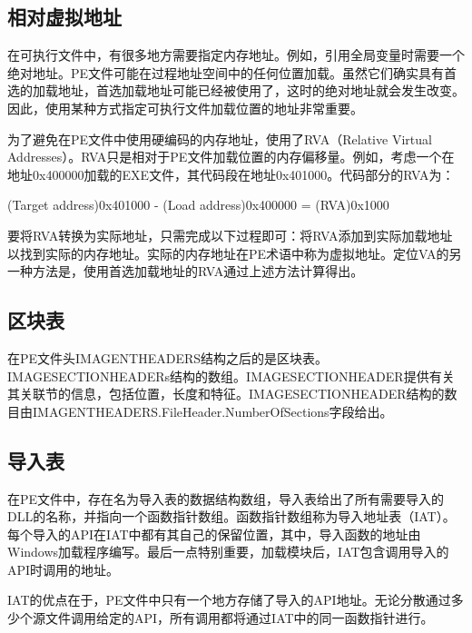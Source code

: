 \subsection{相对虚拟地址}

在可执行文件中，有很多地方需要指定内存地址。例如，引用全局变量时需要一个绝对地址。PE文件可能在过程地址空间中的任何位置加载。虽然它们确实具有首选的加载地址，首选加载地址可能已经被使用了，这时的绝对地址就会发生改变\cite{张晓寒2020基于指令虚拟化的安卓本地代码加固方法}。因此，使用某种方式指定可执行文件加载位置的地址非常重要。

为了避免在PE文件中使用硬编码的内存地址，使用了RVA（Relative Virtual Addresses）。RVA只是相对于PE文件加载位置的内存偏移量。例如，考虑一个在地址0x400000加载的EXE文件，其代码段在地址0x401000\cite{何永瑾2020基于注册码的软件授权保护系统的设计与实现}。代码部分的RVA为：

(Target address)0x401000 - (Load address)0x400000  = (RVA)0x1000

要将RVA转换为实际地址，只需完成以下过程即可：将RVA添加到实际加载地址以找到实际的内存地址。实际的内存地址在PE术语中称为虚拟地址。定位VA的另一种方法是，使用首选加载地址的RVA通过上述方法计算得出。

\subsection{区块表}

在PE文件头IMAGE\textunderscore NT\textunderscore HEADERS结构之后的是区块表。IMAGE\textunderscore SECTION\textunderscore HEADERs结构的数组。IMAGE\textunderscore SECTION\textunderscore HEADER提供有关其关联节的信息，包括位置，长度和特征。IMAGE\textunderscore SECTION\textunderscore HEADER结构的数目由IMAGE\textunderscore NT\textunderscore HEADERS.FileHeader.NumberOfSections字段给出。


\subsection{导入表}


在PE文件中，存在名为导入表的数据结构数组，导入表给出了所有需要导入的DLL的名称，并指向一个函数指针数组。函数指针数组称为导入地址表（IAT）。每个导入的API在IAT中都有其自己的保留位置，其中，导入函数的地址由Windows加载程序编写。最后一点特别重要，加载模块后，IAT包含调用导入的API时调用的地址\cite{2018A}。

IAT的优点在于，PE文件中只有一个地方存储了导入的API地址。无论分散通过多少个源文件调用给定的API，所有调用都将通过IAT中的同一函数指针进行\cite{马雪婷2020一种共享软件保护机制的完整实现}。


